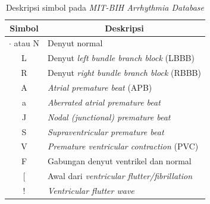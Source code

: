 \begin{table}[H]
    \centering
    \caption{Deskripsi simbol pada \textit{MIT-BIH Arrhythmia Database}}
    \begin{tabular}{| @{\hspace{2em}} c @{\hspace{2em}} | l |}
    \hline
    \multicolumn{1}{|c|}{\textbf{Simbol}} & \multicolumn{1}{c|}{\textbf{Deskripsi}} \\
    \hline
    $\cdot$ atau N & Denyut normal \\
    \hline
    L & Denyut \textit{left bundle branch block} (LBBB) \\
    \hline
    R & Denyut \textit{right bundle branch block} (RBBB) \\
    \hline
    A & \textit{Atrial premature beat} (APB) \\
    \hline
    a & \textit{Aberrated atrial premature beat} \\
    \hline
    J & \textit{Nodal (junctional) premature beat} \\
    \hline
    S & \textit{Supraventricular premature beat} \\
    \hline
    V & \textit{Premature ventricular contraction} (PVC) \\
    \hline
    F & Gabungan denyut ventrikel dan normal \\
    \hline
    {[} & Awal dari \textit{ventricular flutter/fibrillation} \\
    \hline
    ! & \textit{Ventricular flutter wave} \\

\end{tabular}
\end{table}
